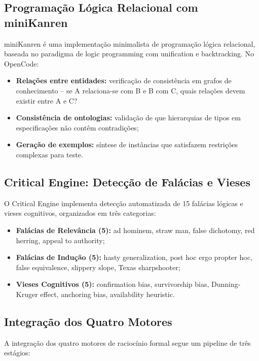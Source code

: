 \documentclass[12pt,a4paper,sumario=tradicional]{abntex2}
\begin{document}
\subsection{Programação Lógica Relacional com miniKanren}

miniKanren é uma implementação minimalista de programação lógica relacional, baseada no paradigma de logic programming com unification e backtracking. No OpenCode:

\begin{itemize}
    \item \textbf{Relações entre entidades:} verificação de consistência em grafos de conhecimento -- se A relaciona-se com B e B com C, quais relações devem existir entre A e C?
    \item \textbf{Consistência de ontologias:} validação de que hierarquias de tipos em especificações não contêm contradições;
    \item \textbf{Geração de exemplos:} síntese de instâncias que satisfazem restrições complexas para teste.
\end{itemize}

\subsection{Critical Engine: Detecção de Falácias e Vieses}

O Critical Engine implementa detecção automatizada de 15 falácias lógicas e vieses cognitivos, organizados em três categorias:

\begin{itemize}
    \item \textbf{Falácias de Relevância (5):} ad hominem, straw man, false dichotomy, red herring, appeal to authority;
    \item \textbf{Falácias de Indução (5):} hasty generalization, post hoc ergo propter hoc, false equivalence, slippery slope, Texas sharpshooter;
    \item \textbf{Vieses Cognitivos (5):} confirmation bias, survivorship bias, Dunning-Kruger effect, anchoring bias, availability heuristic.
\end{itemize}

\subsection{Integração dos Quatro Motores}

A integração dos quatro motores de raciocínio formal segue um pipeline de três estágios:
\end{document}
